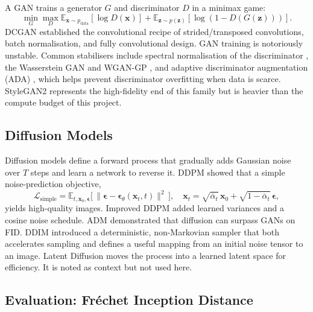 \documentclass[11pt,a4paper]{article}
\begin{document}
A GAN \cite{goodfellow2014gan} trains a generator $G$ and discriminator $D$ in a minimax game:
\begin{equation}
  \min_G \max_D
  \mathbb{E}_{\mathbf{x}\sim p_{\text{data}}}[\log D(\mathbf{x})]
  + \mathbb{E}_{\mathbf{z}\sim p(\mathbf{z})}[\log(1 - D(G(\mathbf{z})))].
\end{equation}
DCGAN \cite{radford2016dcgan} established the convolutional recipe of strided/transposed convolutions, batch normalisation, and fully convolutional design.
GAN training is notoriously unstable. Common stabilisers include spectral normalisation of the discriminator \cite{miyato2018spectralnorm}, the Wasserstein GAN \cite{arjovsky2017wgan} and WGAN-GP \cite{gulrajani2017wgangp}, and adaptive discriminator augmentation (ADA) \cite{karras2020ada}, which helps prevent discriminator overfitting when data is scarce.
StyleGAN2 \cite{karras2020stylegan2} represents the high-fidelity end of this family but is heavier than the compute budget of this project.

\subsection{Diffusion Models}

Diffusion models \cite{sohldickstein2015} define a forward process that gradually adds Gaussian noise over $T$ steps and learn a network to reverse it.
DDPM \cite{ho2020ddpm} showed that a simple noise-prediction objective,
\begin{equation}
  \mathcal{L}_{\text{simple}} =
  \mathbb{E}_{t,\mathbf{x}_0,\boldsymbol{\epsilon}}
  \Big[\,\big\|\boldsymbol{\epsilon} - \boldsymbol{\epsilon}_\theta(\mathbf{x}_t, t)\big\|^2\,\Big],
  \quad
  \mathbf{x}_t = \sqrt{\bar\alpha_t}\,\mathbf{x}_0 + \sqrt{1-\bar\alpha_t}\,\boldsymbol{\epsilon},
\end{equation}
yields high-quality images.
Improved DDPM \cite{nichol2021improved} added learned variances and a cosine noise schedule. ADM \cite{dhariwal2021beatsgans} demonstrated that diffusion can surpass GANs on FID.
DDIM \cite{song2021ddim} introduced a deterministic, non-Markovian sampler that both accelerates sampling and defines a useful mapping from an initial noise tensor to an image.
Latent Diffusion \cite{rombach2022ldm} moves the process into a learned latent space for efficiency. It is noted as context but not used here.

\subsection{Evaluation: Fr\'echet Inception Distance}
\end{document}
